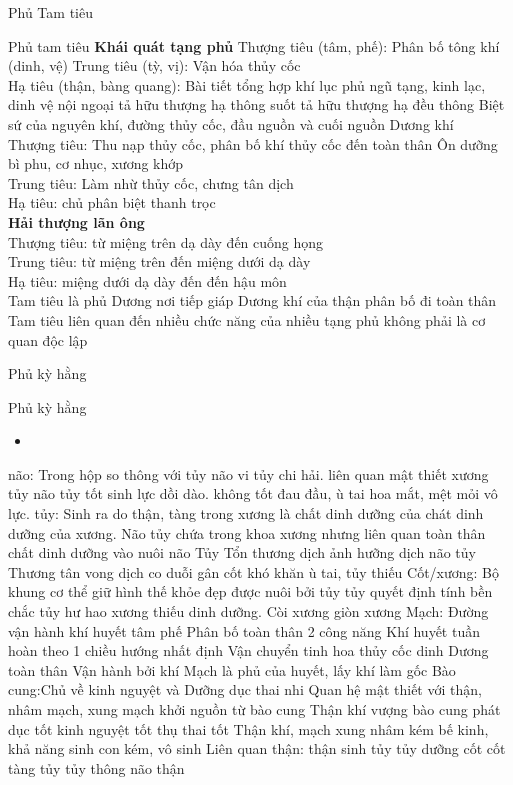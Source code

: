 \documentclass[
	11pt, %
]{beamer}
\theoremstyle{newblock}
\begin{document}
\begin{frame}
	\Huge{Phủ Tam tiêu}
\end{frame}
\begin{frame}{Phủ tam tiêu}
{\bf Khái quát tạng phủ}
Thượng	tiêu	(tâm,	phế):	Phân	bố	tông	khí (dinh, vệ)
Trung tiêu (tỳ, vị): Vận hóa thủy cốc\\
Hạ tiêu (thận, bàng quang): Bài tiết tổng hợp khí lục phủ ngũ tạng, kinh lạc, dinh vệ nội ngoại tả hữu thượng hạ   thông suốt   tả hữu thượng hạ đều thông
Biệt  sứ  của  nguyên  khí,  đường thủy  cốc, 	đầu nguồn và cuối nguồn Dương khí \\
Thượng tiêu: Thu nạp thủy cốc, phân bố khí thủy cốc đến toàn thân Ôn dưỡng bì phu, cơ nhục, xương khớp\\
Trung tiêu: Làm nhừ thủy cốc, chưng tân dịch\\
Hạ tiêu: chủ phân biệt thanh trọc\\
{\bf Hải thượng lãn ông}\\
Thượng tiêu: từ miệng trên dạ dày đến cuống họng\\
Trung tiêu: từ miệng trên đến miệng dưới dạ dày\\
Hạ tiêu: miệng dưới dạ dày đến đến hậu môn\\
Tam tiêu là phủ Dương nơi tiếp giáp Dương khí của thận phân bố đi toàn thân\\
Tam tiêu liên quan đến nhiều chức năng của nhiều tạng phủ  không phải là cơ quan độc lập
\end{frame}
\begin{frame}
	\Huge{Phủ kỳ hằng}
\end{frame}
\begin{frame}{Phủ kỳ hằng}
	\begin{itemize}
		\item 
	\end{itemize}
	não: Trong hộp so thông với tủy não vi tủy chi hải. liên quan mật thiết xương tủy não tủy tốt sinh lực dồi dào. không tốt đau đầu, ù tai hoa mắt, mệt mỏi vô lực.
	tủy: Sinh ra do thận, tàng trong xương là chất dinh dưỡng của chát dinh dưỡng của xương. Não tủy chứa trong khoa xương nhưng liên quan toàn thân chất dinh dưỡng vào nuôi não Tủy
	Tổn thương dịch ảnh hưỡng dịch não tủy 
	Thương tân vong dịch co duỗi gân cốt khó khăn ù tai, tủy thiếu 
	Cốt/xương: Bộ khung cơ thể giữ hình thế khỏe đẹp được nuôi bởi tủy tủy quyết định tính bền chắc tủy hư hao xương thiếu dinh dưỡng. Còi xương giòn xương 
	Mạch: Đường vận hành khí huyết  tâm phế Phân bố toàn thân
	2 công năng
	Khí  huyết  tuần hoàn  theo  1  chiều hướng nhất định
	Vận		chuyển		tinh hoa	thủy	cốc	dinh Dương toàn thân Vận		hành				bởi			khí Mạch	 là		phủ		của huyết,	lấy			khí		 làm gốc
	Bào cung:Chủ về kinh nguyệt và Dưỡng dục thai nhi Quan  hệ  mật  thiết  với thận, nhâm mạch, xung mạch khởi nguồn từ bào cung
	Thận khí vượng   bào cung  phát  dục  tốt    kinh  nguyệt  tốt     thụ thai tốt
	Thận  khí,  mạch  xung nhâm kém     bế  kinh, khả năng sinh con kém, vô sinh
	Liên quan thận: thận sinh tủy   tủy dưỡng cốt   cốt tàng tủy
  tủy thông não   thận
\end{frame}
\end{document}
